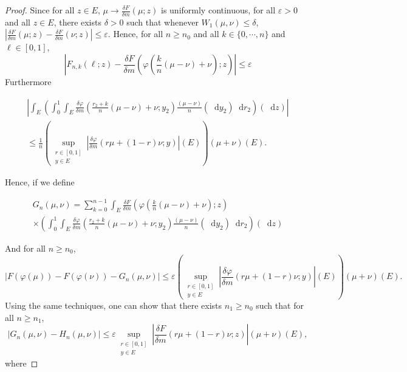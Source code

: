 \documentclass[a4paper,11pt, reqno]{amsart}
\newcommand{\eps}{\varepsilon}
\newcommand{\dd}{\mathop{}\!\mathrm{d}}
\newcommand{\1}{\mathbbm{1}}
\theoremstyle{plain}
\theoremstyle{definition}
\begin{document}
\begin{proof}
  Since for all $z \in E$, $\mu \rightarrow \frac{\delta F}{\delta m} (\mu ;
  z)$ is uniformly continuous, for all $\eps > 0$ and all $z \in E$,
  there exists $\delta > 0$ such that whenever $W_1 (\mu, \nu) \le
  \delta$, $\left| \frac{\delta F}{\delta m} (\mu ; z) - \frac{\delta
  F}{\delta m} (\nu ; z) \right| \le \eps$. Hence, for all $n
  \ge n_0$ and all $k \in \{ 0, \cdots, n \}$ and $\ell \in [0, 1]$,
  \[ \left| F_{n, k} (\ell ; z) - \frac{\delta F}{\delta m} \left( \varphi
     \left( \frac{k}{n} (\mu - \nu) + \nu \right) ; z \right) \right|
     \le \eps \]
  Furthermore
  
  \begin{multline*}
    \left| \int_E \left( \int_0^1 \int_E \frac{\delta \varphi}{\delta m}
    \left( \frac{r_2 + k}{n} (\mu - \nu) + \nu ; y_2 \right) \frac{(\mu -
    \nu)}{n} (\dd y_2) \dd r_2 \right) (\dd z) \right|\\
    \le \frac{1}{n} \left( \underset{\begin{array}{c}
      r \in [0, 1]\\
      y \in E
    \end{array}}{\sup} \left| \frac{\delta \varphi}{\delta m} (r \mu + (1 - r)
    \nu ; y) \right| (E) \right) (\mu + \nu) (E) .
  \end{multline*}
  
  Hence, if we define
  
  \begin{multline*}
    G_n (\mu, \nu) = \sum_{k = 0}^{n - 1} \int_E \frac{\delta F}{\delta m}
    \left( \varphi \left( \frac{k}{n} (\mu - \nu) + \nu \right) ; z \right)\\
    \times \left( \int_0^1 \int_E \frac{\delta \varphi}{\delta m} \left(
    \frac{r_2 + k}{n} (\mu - \nu) + \nu ; y_2 \right) \frac{(\mu - \nu)}{n}
    (\dd y_2) \dd r_2 \right) (\dd z)
  \end{multline*}
  
  And for all $n \ge n_0$,
  \[ | F (\varphi (\mu)) - F (\varphi (\nu)) - G_n (\mu , \nu) |
     \le \eps \left( \underset{\begin{array}{c}
       r \in [0, 1]\\
       y \in E
     \end{array}}{\sup} \left| \frac{\delta \varphi}{\delta m} (r \mu + (1 -
     r) \nu ; y) \right| (E) \right) (\mu + \nu) (E) . \]
  Using the same techniques, one can show that there exists $n_1 \ge
  n_0$ such that for all $n \ge n_1$,
  \[ | G_n (\mu , \nu) - H_n (\mu, \nu) | \le \eps
     \underset{\begin{array}{c}
       r \in [0, 1]\\
       y \in E
     \end{array}}{\sup} \left| \frac{\delta F}{\delta m} (r \mu + (1 - r) \nu
     ; z) \right| (\mu + \nu) (E), \]
  where
  

\end{proof}
\end{document}
